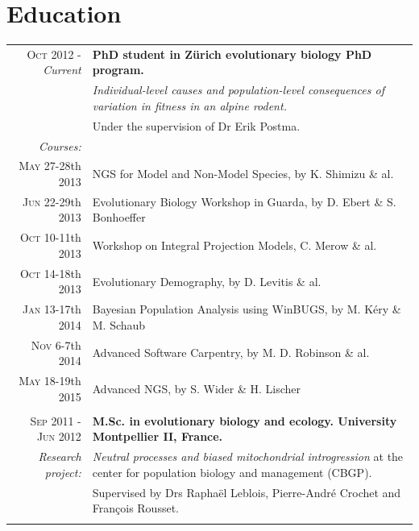 \section{Education}
\begin{tabular}{r|p{11cm}}
\textsc{Oct 2012 -} \emph{Current} & \textbf{PhD student in Z\"{u}rich evolutionary biology PhD program.}\\
								& \emph{Individual-level causes and population-level consequences of variation in fitness in an alpine rodent.}\\ 
								& \footnotesize{Under the supervision of Dr Erik Postma.}\\
\textit{Courses:} & \\
\footnotesize{\textsc{May 27-28}th 2013}& NGS for Model and Non-Model Species, by K. Shimizu \& al.\\
\footnotesize{\textsc{Jun 22-29}th 2013}& Evolutionary Biology Workshop in Guarda, by D. Ebert \& S. Bonhoeffer\\
\footnotesize{\textsc{Oct 10-11}th 2013}& Workshop on Integral Projection Models, C. Merow \& al.\\
\footnotesize{\textsc{Oct 14-18}th 2013}& Evolutionary Demography, by D. Levitis \& al.\\
\footnotesize{\textsc{Jan 13-17}th 2014}& Bayesian Population Analysis using WinBUGS, by M. K\'{e}ry \& M. Schaub\\
\footnotesize{\textsc{Nov 6-7}th 2014}& Advanced Software Carpentry, by M. D. Robinson \& al.\\
\footnotesize{\textsc{May 18-19}th 2015}& Advanced NGS, by S. Wider \& H. Lischer\\
\multicolumn{2}{c}{} \\


\textsc{Sep 2011 - Jun 2012} & \textbf{M.Sc. in evolutionary biology and ecology. University Montpellier II, France.}\\
\textit{Research project:} & \emph{Neutral processes and biased mitochondrial introgression} at the center for population biology and management (CBGP).\\
& \footnotesize{Supervised by Drs Rapha\"{e}l Leblois, Pierre-Andr\'{e} Crochet and Fran\c{c}ois Rousset.}\\
\multicolumn{2}{c}{} \\



\end{tabular}
